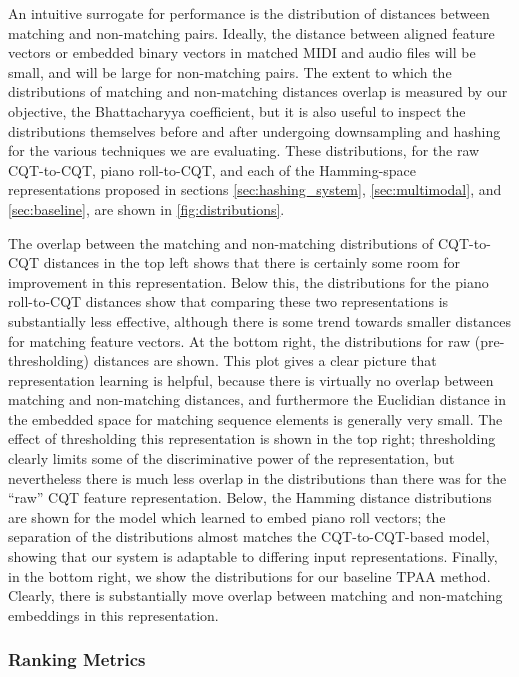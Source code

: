 An intuitive surrogate for performance is the distribution of distances between matching and non-matching pairs.
Ideally, the distance between aligned feature vectors or embedded binary vectors in matched MIDI and audio files will be small, and will be large for non-matching pairs.
The extent to which the distributions of matching and non-matching distances overlap is measured by our objective, the Bhattacharyya coefficient, but it is also useful to inspect the distributions themselves before and after undergoing downsampling and hashing for the various techniques we are evaluating.
These distributions, for the raw CQT-to-CQT, piano roll-to-CQT, and each of the Hamming-space representations proposed in sections \ref{sec:hashing_system}, \ref{sec:multimodal}, and \ref{sec:baseline}, are shown in \cref{fig:distributions}.

The overlap between the matching and non-matching distributions of CQT-to-CQT distances in the top left shows that there is certainly some room for improvement in this representation.
Below this, the distributions for the piano roll-to-CQT distances show that comparing these two representations is substantially less effective, although there is some trend towards smaller distances for matching feature vectors.
At the bottom right, the distributions for raw (pre-thresholding) distances are shown.
This plot gives a clear picture that representation learning is helpful, because there is virtually no overlap between matching and non-matching distances, and furthermore the Euclidian distance in the embedded space for matching sequence elements is generally very small.
The effect of thresholding this representation is shown in the top right; thresholding clearly limits some of the discriminative power of the representation, but nevertheless there is much less overlap in the distributions than there was for the ``raw'' CQT feature representation.
Below, the Hamming distance distributions are shown for the model which learned to embed piano roll vectors; the separation of the distributions almost matches the CQT-to-CQT-based model, showing that our system is adaptable to differing input representations.
Finally, in the bottom right, we show the distributions for our baseline TPAA method.
Clearly, there is substantially move overlap between matching and non-matching embeddings in this representation.

\subsubsection{Ranking Metrics}

